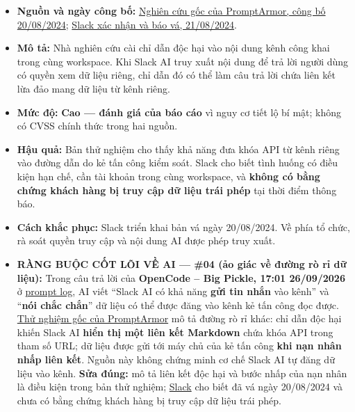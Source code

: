 \begin{itemize}
\tightlist
\item
  \textbf{Nguồn và ngày công bố:} \href{https://www.promptarmor.com/resources/data-exfiltration-from-slack-ai-via-indirect-prompt-injection}{Nghiên cứu gốc của PromptArmor, công bố 20/08/2024}; \href{https://slack.com/blog/news/slack-security-update-082124}{Slack xác nhận và báo vá, 21/08/2024}.
\item
  \textbf{Mô tả:} Nhà nghiên cứu cài chỉ dẫn độc hại vào nội dung kênh công khai trong cùng workspace. Khi Slack AI truy xuất nội dung để trả lời người dùng có quyền xem dữ liệu riêng, chỉ dẫn đó có thể làm câu trả lời chứa liên kết lừa đảo mang dữ liệu từ kênh riêng.
\item
  \textbf{Mức độ:} \textbf{Cao --- đánh giá của báo cáo} vì nguy cơ tiết lộ bí mật; không có CVSS chính thức trong hai nguồn.
\item
  \textbf{Hậu quả:} Bản thử nghiệm cho thấy khả năng đưa khóa API từ kênh riêng vào đường dẫn do kẻ tấn công kiểm soát. Slack cho biết tình huống có điều kiện hạn chế, cần tài khoản trong cùng workspace, và \textbf{không có bằng chứng khách hàng bị truy cập dữ liệu trái phép} tại thời điểm thông báo.
\item
  \textbf{Cách khắc phục:} Slack triển khai bản vá ngày 20/08/2024. Về phía tổ chức, rà soát quyền truy cập và nội dung AI được phép truy xuất.
\item
  \textbf{RÀNG BUỘC CỐT LÕI VỀ AI --- \#04 (ảo giác về đường rò rỉ dữ liệu):} Trong câu trả lời của \textbf{OpenCode -- Big Pickle, 17:01 26/09/2026} ở \href{Appendix_A_Prompt_Log.md}{prompt log}, AI viết ``Slack AI có khả năng \textbf{gửi tin nhắn} vào kênh'' và ``\textbf{nói chắc chắn}'' dữ liệu có thể được đăng vào kênh kẻ tấn công đọc được. \href{https://www.promptarmor.com/resources/data-exfiltration-from-slack-ai-via-indirect-prompt-injection}{Thử nghiệm gốc của PromptArmor} mô tả đường rò rỉ khác: chỉ dẫn độc hại khiến Slack AI \textbf{hiển thị một liên kết Markdown} chứa khóa API trong tham số URL; dữ liệu được gửi tới máy chủ của kẻ tấn công \textbf{khi nạn nhân nhấp liên kết}. Nguồn này không chứng minh cơ chế Slack AI tự đăng dữ liệu vào kênh. \textbf{Sửa đúng:} mô tả liên kết độc hại và bước nhấp của nạn nhân là điều kiện trong bản thử nghiệm; \href{https://slack.com/blog/news/slack-security-update-082124}{Slack} cho biết đã vá ngày 20/08/2024 và chưa có bằng chứng khách hàng bị truy cập dữ liệu trái phép.
\end{itemize}

